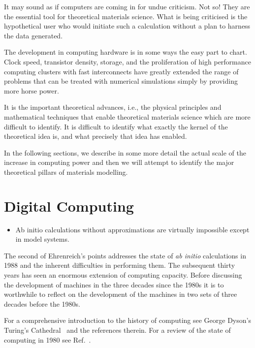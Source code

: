 It may sound as if computers are coming in for undue criticism. Not so! They
are the essential tool for theoretical materials science. What is being criticised
is the hypothetical user who would initiate such a calculation without a
plan to harness the data generated.

The development in computing hardware is in some ways the easy part to chart. 
Clock speed, transistor density, storage, and the proliferation of high 
performance computing clusters with fast interconnects have greatly extended 
the range of problems that can be treated with numerical simulations
simply by providing more horse power.
 

It is the important theoretical advances, i.e., the physical principles and
mathematical techniques that enable theoretical materials science 
which are more difficult to identify. It is difficult to identify what exactly 
the kernel of the theoretical idea is, and what precisely that idea has enabled. 

In the following sections, we describe in some more detail the 
actual scale of the increase in computing power and then we will
attempt to identify the major theoretical pillars of 
materials modelling.

\section{Digital Computing}
\label{sec:riseofcomp}
\begin{itemize}
\item Ab initio calculations without approximations are virtually impossible 
      except in model systems.
\end{itemize}

The second of Ehrenreich's points addresses the state of
{\it ab initio} calculations in 1988 and the inherent 
difficulties in performing them.
The subsequent thirty years has seen an enormous extension of computing capacity. 
Before discussing the development of machines in the three decades since the 1980s it
is to worthwhile to reflect on the development of the machines in two
sets of three decades before the 1980s. 

For a comprehensive introduction to the history of computing see 
George Dyson's Turing's Cathedral~\cite{dyson12} 
and the references therein. For a review of the state of computing in
1980 see Ref.~\cite{metropolis80}.

